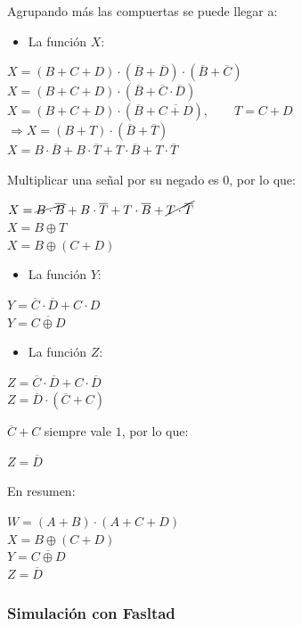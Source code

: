 \sangria{} Agrupando más las compuertas se puede llegar a:

\begin{itemize}[nosep] \item La función $X$: \end{itemize}
\begin{center}
$X = (B + C +D )\cdot{}(\overline{B} + \overline{D})\cdot{}(\overline{B} + \overline{C})$ \\[5pt]
$X = (B + C +D )\cdot{}(\overline{B} + \overline{C}\cdot{}\overline{D})$ \\[10pt]
$X = (B+C+D)\cdot{}(\overline{B}+\overline{C+D}),\qquad{}T = C+D$ \\[10pt]
$\Rightarrow{} X = (B+T)\cdot{}(\overline{B}+\overline{T})$ \\[10pt]
$X = B\cdot{}\overline{B}+B\cdot\overline{T}+T\cdot{}\overline{B}+T\cdot\overline{T}$
\end{center}
\noindent{} Multiplicar una señal por su negado es $0$, por lo que:
\begin{center}
$X = \cancel{B\cdot{}\overline{B}}+B\cdot\overline{T}+T\cdot{}\overline{B}+\cancel{T\cdot\overline{T}}$ \\[10pt]
$X = B \oplus T$ \\[10pt] 
$X = B \oplus (C +D)$
\end{center}

\begin{itemize}[nosep] \item La función $Y$: \end{itemize} \begin{center}
$Y = \overline{C}\cdot{}\overline{D} + C\cdot{}D$ \\[10pt]
$Y = \overline{C \oplus{} D}$\end{center}

\begin{itemize}[nosep] \item La función $Z$: \end{itemize} \begin{center}
$Z = \overline{C}\cdot\overline{D} + C\cdot{}\overline{D}$ \\[10pt]
$Z = \overline{D}\cdot{}(\overline{C} + C)$
\end{center}
\noindent{}$\overline{C} + C$ siempre vale $1$, por lo que:
\begin{center}
    $Z = \overline{D}$
\end{center}

\noindent{} En resumen:
\begin{center}

    $W = (A + B)\cdot{}(A + C +D)$ \\[10pt]
    $X = B \oplus (C +D)$ \\[10pt]
    $Y = \overline{C \oplus{} D}$ \\[10pt]
    $Z = \overline{D}$
\end{center}
\subsubsection{Simulación con Fasltad}
